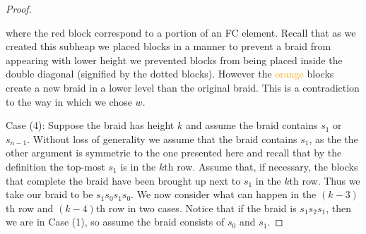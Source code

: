 \begin{theorem}
\begin{proof}
\begin{center}
	\end{center}
	where the \textcolor{rred}{red} block correspond to a portion of an FC element. Recall that as we created this subheap we placed blocks in a manner to prevent a braid from appearing with lower height we prevented blocks from being placed inside the double diagonal (signified by the dotted blocks). However the \textcolor{orange}{orange} blocks create a new braid in a lower level than the original braid. This is a contradiction to the way in which we chose $w$.  
%		
%		
%	
%		
		
	Case (4): Suppose the braid has height $k$ and assume the braid contains $s_1$ or $s_{n-1}$. Without loss of generality we assume that the braid contains $s_1$, as the the other argument is symmetric to the one presented here and recall that by the definition the top-most $s_1$ is in the $k$th row. Assume that, if necessary, the blocks that complete the braid have been brought up next to $s_1$ in the $k$th row. Thus we take our braid to be $s_1s_0s_1s_0$. We now consider what can happen in the $(k-3)$th row and $(k-4)$th row in two cases. Notice that if the braid is  $s_1s_2s_1$, then we are in Case (1), so assume the braid consists of $s_0$ and $s_1$. 
	

\end{proof}
\end{theorem}
